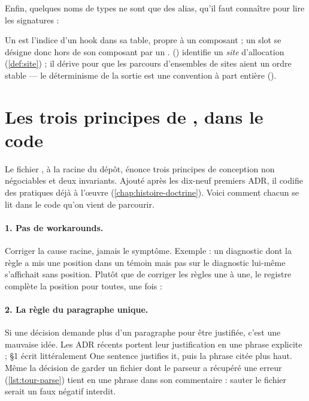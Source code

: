 Enfin, quelques noms de types ne sont que des alias, qu'il faut connaître pour lire les signatures :


Un  est l'indice d'un hook dans sa table, propre à un composant ; un slot se désigne donc hors de son composant par un .  () identifie un \emph{site} d'allocation (\cref{def:site}) ; il dérive  pour que les parcours d'ensembles de sites aient un ordre stable --- le déterminisme de la sortie est une convention à part entière ().

\section{Les trois principes de , dans le code}
\label{sec:tour-architecture-principes}

Le fichier , à la racine du dépôt, énonce trois principes de conception \og non négociables\fg{} et deux invariants. Ajouté après les dix-neuf premiers ADR, il codifie des pratiques déjà à l'œuvre (\cref{chap:histoire-doctrine}). Voici comment chacun se lit dans le code qu'on vient de parcourir.

\paragraph{1. Pas de workarounds.} \og Corriger la cause racine, jamais le symptôme.\fg{} Exemple : un diagnostic dont la règle a mis une position dans un témoin mais pas sur le diagnostic lui-même s'affichait sans position. Plutôt que de corriger les règles une à une, le registre complète la position pour toutes, une fois :


\paragraph{2. La règle du paragraphe unique.} \og Si une décision demande plus d'un paragraphe pour être justifiée, c'est une mauvaise idée.\fg{} Les ADR récents portent leur justification en une phrase explicite ;  §1 écrit littéralement \og One sentence justifies it\fg{}, puis la phrase citée plus haut. Même la décision de garder un fichier dont le parseur a récupéré une erreur (\cref{lst:tour-parse}) tient en une phrase dans son commentaire : sauter le fichier serait un faux négatif interdit.

